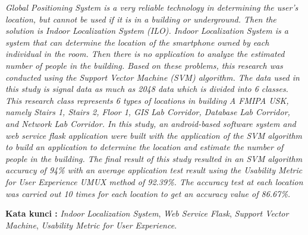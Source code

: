 \begin{abstracteng}

    \textit{Global Positioning System is a very reliable technology in determining the user's location, but cannot be used if it is in a building or underground. Then the solution is Indoor Localization System (ILO). Indoor Localization System is a system that can determine the location of the smartphone owned by each individual in the room. Then there is no application to analyze the estimated number of people in the building. Based on these problems, this research was conducted using the Support Vector Machine (SVM) algorithm. The data used in this study is signal data as much as 2048 data which is divided into 6 classes. This research class represents 6 types of locations in building A FMIPA USK, namely Stairs 1, Stairs 2, Floor 1, GIS Lab Corridor, Database Lab Corridor, and Network Lab Corridor. In this study, an android-based software system and web service flask application were built with the application of the SVM algorithm to build an application to determine the location and estimate the number of people in the building. The final result of this study resulted in an SVM algorithm accuracy of 94\% with an average application test result using the Usability Metric for User Experience UMUX method of 92.39\%. The accuracy test at each location was carried out 10 times for each location to get an accuracy value of 86.67\%.}


    \bigskip
    \noindent
    \textbf{Kata kunci :} \textit{Indoor Localization System}, \textit{Web Service Flask}, \textit{Support Vector Machine}, \textit{Usability Metric for User Experience}.
\end{abstracteng}